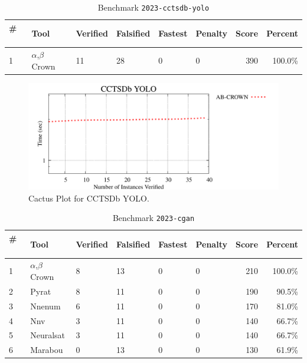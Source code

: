 
\begin{table}[h]
\begin{center}
\caption{Benchmark \texttt{2023-cctsdb-yolo}} \label{tab:cat_{cat}}
{\setlength{\tabcolsep}{2pt}
\begin{tabular}[h]{@{}llllllrr@{}}
\toprule
\textbf{\# ~} & \textbf{Tool} & \textbf{Verified} & \textbf{Falsified} & \textbf{Fastest} & \textbf{Penalty} & \textbf{Score} & \textbf{Percent}\\
\midrule
1 & $\alpha$,$\beta$ Crown & 11 & 28 & 0 & 0 & 390 & 100.0\% \\
\bottomrule
\end{tabular}
}
\end{center}
\end{table}



\begin{figure}[h]
\centerline{\includegraphics[width=\textwidth]{cactus/2023_cctsdb_yolo.pdf}}
\caption{Cactus Plot for CCTSDb YOLO.}
\label{fig:quantPic}
\end{figure}



\begin{table}[h]
\begin{center}
\caption{Benchmark \texttt{2023-cgan}} \label{tab:cat_{cat}}
{\setlength{\tabcolsep}{2pt}
\begin{tabular}[h]{@{}llllllrr@{}}
\toprule
\textbf{\# ~} & \textbf{Tool} & \textbf{Verified} & \textbf{Falsified} & \textbf{Fastest} & \textbf{Penalty} & \textbf{Score} & \textbf{Percent}\\
\midrule
1 & $\alpha$,$\beta$ Crown & 8 & 13 & 0 & 0 & 210 & 100.0\% \\
2 & Pyrat & 8 & 11 & 0 & 0 & 190 & 90.5\% \\
3 & Nnenum & 6 & 11 & 0 & 0 & 170 & 81.0\% \\
4 & Nnv & 3 & 11 & 0 & 0 & 140 & 66.7\% \\
5 & Neuralsat & 3 & 11 & 0 & 0 & 140 & 66.7\% \\
6 & Marabou & 0 & 13 & 0 & 0 & 130 & 61.9\% \\
\bottomrule
\end{tabular}
}
\end{center}
\end{table}



